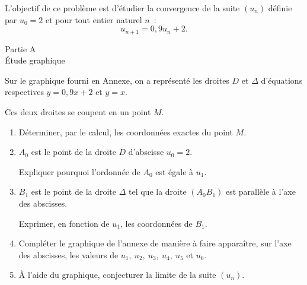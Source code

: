 %
%
\par

L'objectif de ce problème est d'étudier la convergence de la suite $(u_n)$ définie par $u_0=2$ et pour tout entier naturel $n$~:
\[ u_{n+1} = 0,9u_n+2.\]
\begin{center}\begin{h3}Partie A\\ \'Etude graphique \end{h3}\end{center}
Sur le graphique fourni en Annexe, on a représenté les droites $D$ et $\Delta$ d'équations respectives $y=0,9x+2$ et $y=x$.
\par
Ces deux droites se coupent en un point $M$.
\begin{enumerate}
     \item
     Déterminer, par le calcul, les coordonnées exactes du point $M$.
     \item
     $A_0$ est le point de la droite $D$ d'abscisse $u_0=2$.
     \par
     Expliquer pourquoi l'ordonnée de $A_0$ est égale à $u_1$.
     \item
     $B_1$ est le point de la droite $\Delta$ tel que la droite $(A_0B_1)$ est parallèle à l'axe des abscisses.
     \par
     Exprimer, en fonction de $u_1$, les coordonnées de $B_1$.
     \item
     Compléter le graphique de l'annexe de manière à faire apparaître, sur l'axe des abscisses, les valeurs de $u_1,\ u_2,\ u_3,\ u_4,\ u_5$ et $u_6$.
     \item
     \`A l'aide du graphique, conjecturer la limite de la suite $(u_n)$.
\end{enumerate}
